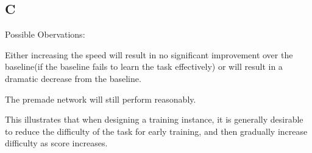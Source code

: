 \documentclass[12]{extarticle}
\begin{document}
\subsection{C}

Possible Obervations:

Either increasing the speed will result in no significant improvement over the baseline(if the baseline fails to learn the task effectively) or will result in a dramatic decrease from the baseline.

The premade network will still perform reasonably.

This illustrates that when designing a training instance, it is generally desirable to reduce the difficulty of the task for early training, and then gradually increase difficulty as score increases.
\end{document}
